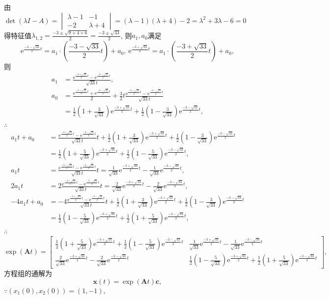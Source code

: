 \documentclass[12pt,UTF8]{ctexart}
\newcommand{\me}[0]{\mathrm e}
\begin{document}
\begin{enumerate}
由$\det(\lambda I-A)=\begin{vmatrix}\lambda-1&-1\\-2&\lambda+4\end{vmatrix}=(\lambda-1)(\lambda+4)-2=\lambda^2+3\lambda-6=0$得特征值$\lambda_{1,2}=\frac{-3\pm\sqrt{9+4\times6}}2=\frac{-3\pm\sqrt{33}}2$, 则$a_1,a_0$满足
\[\me^{\frac{-3-\sqrt{33}}2t}=a_1\cdot(\frac{-3-\sqrt{33}}2t)+a_0,\ \me^{\frac{-3+\sqrt{33}}2t}=a_1\cdot(\frac{-3+\sqrt{33}}2t)+a_0,\]
则
\[\begin{aligned}
a_1&=\frac{\me^{\frac{-3+\sqrt{33}}2t}-\me^{\frac{-3-\sqrt{33}}2t}}{\sqrt{33}t},\\
a_0&=\frac{\me^{\frac{-3+\sqrt{33}}2t}+\me^{\frac{-3-\sqrt{33}}2t}}2+\frac32t\frac{\me^{\frac{-3+\sqrt{33}}2t}-\me^{\frac{-3-\sqrt{33}}2t}}{\sqrt{33}t}\\
&=\frac12(1+\frac3{\sqrt{33}})\me^{\frac{-3+\sqrt{33}}2t}+\frac12(1-\frac3{\sqrt{33}})\me^{\frac{-3-\sqrt{33}}2t},
\end{aligned}\]
$\therefore$
\[\begin{aligned}
a_1t+a_0&=\frac{\me^{\frac{-3+\sqrt{33}}2t}-\me^{\frac{-3-\sqrt{33}}2t}}{\sqrt{33}t}t+\frac12(1+\frac3{\sqrt{33}})\me^{\frac{-3+\sqrt{33}}2t}+\frac12(1-\frac3{\sqrt{33}})\me^{\frac{-3-\sqrt{33}}2t}\\
&=\frac12(1+\frac5{\sqrt{33}})\me^{\frac{-3+\sqrt{33}}2t}+\frac12(1-\frac5{\sqrt{33}})\me^{\frac{-3-\sqrt{33}}2t},\\
a_1t&=\frac{\me^{\frac{-3+\sqrt{33}}2t}-\me^{\frac{-3-\sqrt{33}}2t}}{\sqrt{33}t}t=\frac1{\sqrt{33}}\me^{\frac{-3+\sqrt{33}}2t}-\frac1{\sqrt{33}}\me^{\frac{-3-\sqrt{33}}2t},\\
2a_1t&=2\frac{\me^{\frac{-3+\sqrt{33}}2t}-\me^{\frac{-3-\sqrt{33}}2t}}{\sqrt{33}t}t=\frac2{\sqrt{33}}\me^{\frac{-3+\sqrt{33}}2t}-\frac2{\sqrt{33}}\me^{\frac{-3-\sqrt{33}}2t},\\
-4a_1t+a_0&=-4\frac{\me^{\frac{-3+\sqrt{33}}2t}-\me^{\frac{-3-\sqrt{33}}2t}}{\sqrt{33}t}t+\frac12(1+\frac3{\sqrt{33}})\me^{\frac{-3+\sqrt{33}}2t}+\frac12(1-\frac3{\sqrt{33}})\me^{\frac{-3-\sqrt{33}}2t}\\
&=\frac12(1-\frac5{\sqrt{33}})\me^{\frac{-3+\sqrt{33}}2t}+\frac12(1+\frac5{\sqrt{33}})\me^{\frac{-3-\sqrt{33}}2t},
\end{aligned}\]
$\therefore$
\[
\exp(\bm At)=\begin{bmatrix}
\frac12(1+\frac5{\sqrt{33}})\me^{\frac{-3+\sqrt{33}}2t}+\frac12(1-\frac5{\sqrt{33}})\me^{\frac{-3-\sqrt{33}}2t}&\frac1{\sqrt{33}}\me^{\frac{-3+\sqrt{33}}2t}-\frac1{\sqrt{33}}\me^{\frac{-3-\sqrt{33}}2t}\\
\frac2{\sqrt{33}}\me^{\frac{-3+\sqrt{33}}2t}-\frac2{\sqrt{33}}\me^{\frac{-3-\sqrt{33}}2t}&\frac12(1-\frac5{\sqrt{33}})\me^{\frac{-3+\sqrt{33}}2t}+\frac12(1+\frac5{\sqrt{33}})\me^{\frac{-3-\sqrt{33}}2t}
\end{bmatrix},
\]
方程组的通解为
\[\bm x(t)=\exp(\bm At)\bm c,\]
$\because(x_1(0),x_2(0))=(1,-1)$,


\end{enumerate}
\end{document}
